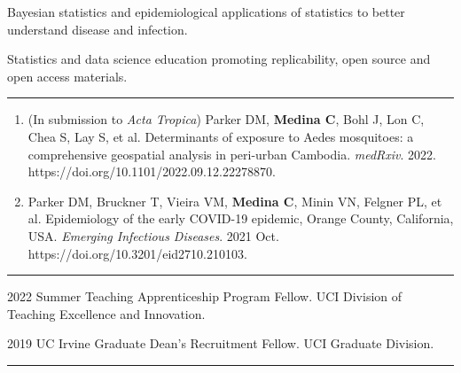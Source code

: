 \documentclass{article}
\begin{document}


\begin{description}
	\vspace{-2mm}
	\item[Research Interests]\hspace*{.1in}
		
		Bayesian statistics and epidemiological applications of statistics to better understand disease and infection.
		
		Statistics and data science education promoting replicability, open source and open access materials.
		
\end{description}
\vspace{-2mm}
\rule{\linewidth}{1pt}




\begin{description}
	\vspace{-2mm}
	\item[Publications]\hspace*{.1in} 
		\begin{enumerate}
			\item (In submission to \textit{Acta Tropica}) Parker DM, \textbf{Medina C}, Bohl J, Lon C, Chea S, Lay S, et al. Determinants of exposure to Aedes mosquitoes: a comprehensive geospatial analysis in peri-urban Cambodia. \textit{medRxiv}. 2022. https://doi.org/10.1101/2022.09.12.22278870.
			
			\item Parker DM, Bruckner T, Vieira VM, \textbf{Medina C}, Minin VN, Felgner PL, et al. Epidemiology of the early COVID-19 epidemic, Orange County, California, USA. \textit{Emerging Infectious Diseases}. 2021 Oct. https://doi.org/10.3201/eid2710.210103. 
		\end{enumerate}

\end{description}
\vspace{-2mm}
\rule{\linewidth}{1pt}





\begin{description}
	\vspace{-2mm}
	\item[Fellowships]\hspace*{.1in}

		2022 Summer Teaching Apprenticeship Program Fellow. UCI Division of Teaching Excellence and Innovation.
		\vspace*{1mm}
		
		2019 UC Irvine Graduate Dean's Recruitment Fellow. UCI Graduate Division.

\end{description}
\vspace{-2mm}
\rule{\linewidth}{1pt}
\end{document}
